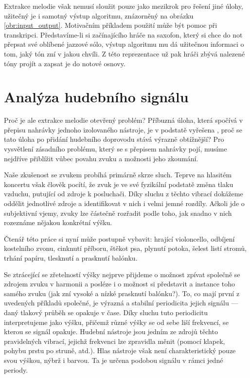 Extrakce melodie však nemusí sloužit pouze jako mezikrok pro řešení jiné úlohy, užitečný je i samotný výstup algoritmu, znázorněný na obrázku \ref{obr:input_output}. Motivačním příkladem použití může být pomoc při transkripci. Představíme-li si začínajícího hráče na saxofon, který si chce do not přepsat své oblíbené jazzové sólo, výstup algoritmu mu dá užitečnou informaci o tom, jaký tón zní v jakou chvíli. Z této reprezentace už pak hráči zbývá nalezené tóny projít a zapsat je do notové osnovy.

\section{Analýza hudebního signálu}

Proč je ale extrakce melodie otevřený problém? Příbuzná úloha, která spočívá v přepisu nahrávky jednoho izolovaného nástroje, je v podstatě vyřešena \citep{Mauch2014a}, proč se tato úloha po přidání hudebního doprovodu stává výrazně obtížnější? Pro vysvětlení zásadního problému, který se s přepisem nahrávky pojí, musíme nejdříve přiblížit vůbec povahu zvuku a možnosti jeho zkoumání.

Naše zkušenost se zvukem probíhá primárně skrze sluch. Teprve na hlasitém koncertu však člověk pocítí, že zvuk je ve své fyzikální podstatě změna tlaku vzduchu, putující od zdroje k posluchači. Díky sluchu z těchto vibrací dokážeme oddělit jednotlivé zdroje a identifikovat v nich i velmi jemné rozdíly. Ačkoli jde o subjektivní vjemy, zvuky lze částečně rozřadit podle toho, jak snadno v nich rozeznáme nějakou konkrétní výšku. 

\vspace*{0.5cm}

Čtenář této práce si nyní může postupně vybavit: hrající violoncello, odbíjení kostelního zvonu, cinknutí příboru, štěkot psa, plynutí potoka, šelest listí stromů, trhání papíru, tlesknutí a prasknutí balónku.

\vspace*{0.5cm}

Se ztrácející se zřetelností výšky nejprve přijdeme o možnost zpívat společně se zdrojem zvuku v harmonii a posléze i o možnost si představit  a  instance toho samého zvuku (jak zní vysoké a nízké prasknutí balónku?). To, co mají první z uvedených příkladů společné, je výrazná a stabilní periodicita jejich signálu --- daný tlakový průběh se opakuje v čase. Díky sluchu tuto periodicitu interpretujeme jako výšku, přičemž různé výšky se od sebe liší frekvencí, se kterou se signál opakuje. Hudební nástroje jsou jedním ze zdrojů těchto pravidelných vibrací, jejichž frekvenci lze zpravidla měnit (pomocí klapek, pohybu prstu po struně, atd.). Hlas nástroje však není charakteristický pouze svou výškou, nýbrž i barvou. Ta je určena podobou signálu v rámci jedné periody. 

